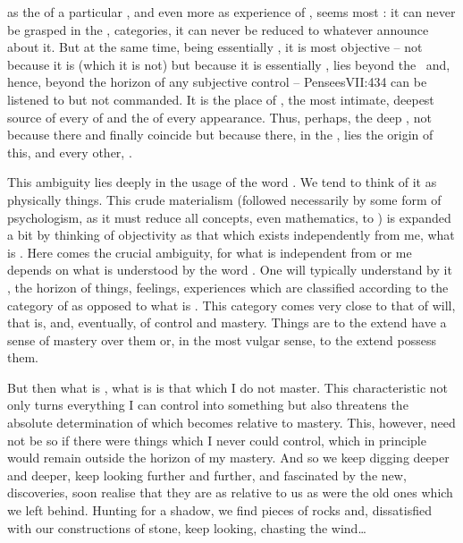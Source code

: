 \label{sub:objsubj}

\pa\label{pa:objsubj}  as the  of a particular ,
and even more  as  {experience} of , seems most
: it can never be grasped in the , 
categories, it can never be reduced to whatever  announce about
it.  But at the same time, being essentially , it is most
{objective} -- not because it is  (which it is not) but because it
is essentially , lies beyond the \hoa\ and, hence, beyond the
horizon of any {subjective} control -- \citet{man infinitely transcends
  man.}{Pensees}{VII:434\label{cit:manMan}}  can be listened to but not
commanded.  It is the place of , the most intimate, deepest
source of every  of  and the  of
every appearance.  Thus, perhaps, the deep , not
because there  and  finally coincide but because there,
in the , lies the origin of this, and every other,
.

\pa This ambiguity lies deeply in the usage of the word .  We
tend to think of it as physically  {things}.  This crude
materialism (followed necessarily by some form of psychologism, as it must
reduce all concepts, even mathematics, to ) is expanded a bit
by thinking of objectivity as that which exists independently from me, what is
.  Here comes the crucial ambiguity, for what is independent from
or  me depends on what is understood by the word .  One will
typically understand by it , the horizon of things, feelings,
experiences which are classified according to the category of  as
opposed to what is .  This category comes very close to that of
will, that is,  and, eventually, of control and mastery.  Things are
 to the extend  have a sense of mastery over them or, in the most
vulgar sense, to the extend  possess them.

But then what is , what is  is that which I do not
master. This characteristic not only turns everything I can control into
something  but also threatens the absolute determination of
 which becomes relative to  mastery. This, however, need not
be so if there were things which I never could control, which in principle would
remain outside the horizon of my mastery. And so we keep digging deeper and
deeper, keep looking further and further, and fascinated by the new,
 discoveries, soon realise that they are as relative to us as
were the old ones which we left behind. Hunting for a shadow, we find pieces of
rocks and, dissatisfied with our constructions of stone, keep looking, chasting
the wind\ldots

